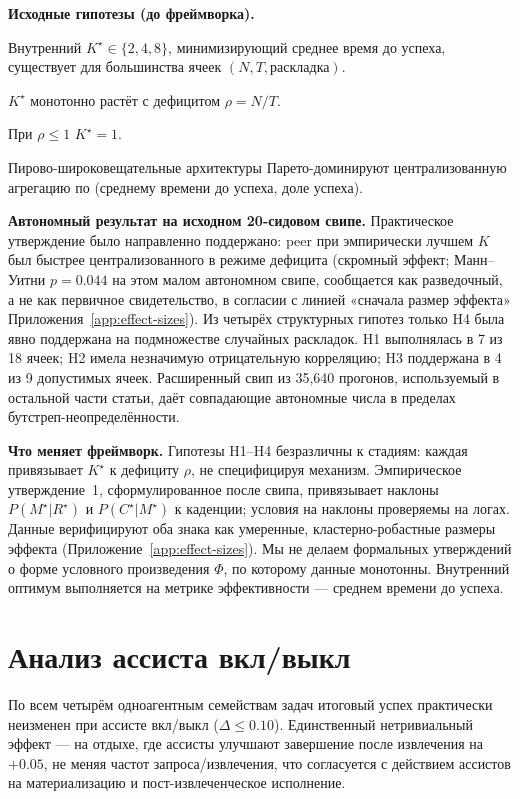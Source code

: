 \documentclass{article}
\begin{document}
\textbf{Исходные гипотезы (до фреймворка).}
\begin{description}[leftmargin=10pt,topsep=2pt,itemsep=1pt]
\item[H1.] Внутренний $K^\star \in \{2,4,8\}$, минимизирующий среднее время до успеха, существует для большинства ячеек $(N, T, \text{раскладка})$.
\item[H2.] $K^\star$ монотонно растёт с дефицитом $\rho = N/T$.
\item[H3.] При $\rho \le 1$ $K^\star = 1$.
\item[H4.] Пирово-широковещательные архитектуры Парето-доминируют централизованную агрегацию по (среднему времени до успеха, доле успеха).
\end{description}

\textbf{Автономный результат на исходном 20-сидовом свипе.}
Практическое утверждение было направленно поддержано: peer при эмпирически лучшем $K$ был быстрее централизованного в режиме дефицита (скромный эффект; Манн--Уитни $p{=}0.044$ на этом малом автономном свипе, сообщается как разведочный, а не как первичное свидетельство, в согласии с линией «сначала размер эффекта» Приложения~\ref{app:effect-sizes}). Из четырёх структурных гипотез только H4 была явно поддержана на подмножестве случайных раскладок. H1 выполнялась в 7 из 18 ячеек; H2 имела незначимую отрицательную корреляцию; H3 поддержана в 4 из 9 допустимых ячеек. Расширенный свип из 35{,}640 прогонов, используемый в остальной части статьи, даёт совпадающие автономные числа в пределах бутстреп-неопределённости.

\textbf{Что меняет фреймворк.}
Гипотезы H1--H4 безразличны к стадиям: каждая привязывает $K^\star$ к дефициту $\rho$, не специфицируя механизм. Эмпирическое утверждение~1, сформулированное после свипа, привязывает наклоны $P(M^\star|R^\star)$ и $P(C^\star|M^\star)$ к каденции; условия на наклоны проверяемы на логах. Данные верифицируют оба знака как умеренные, кластерно-робастные размеры эффекта (Приложение~\ref{app:effect-sizes}). Мы не делаем формальных утверждений о форме условного произведения $\Phi$, по которому данные монотонны. Внутренний оптимум выполняется на метрике эффективности --- среднем времени до успеха.

\section{Анализ ассиста вкл/выкл}
\label{app:assist}

По всем четырём одноагентным семействам задач итоговый успех практически неизменен при ассисте вкл/выкл ($\Delta \le 0.10$). Единственный нетривиальный эффект --- на отдыхе, где ассисты улучшают завершение после извлечения на~$+0.05$, не меняя частот запроса/извлечения, что согласуется с действием ассистов на материализацию и пост-извлеченческое исполнение.
\end{document}
